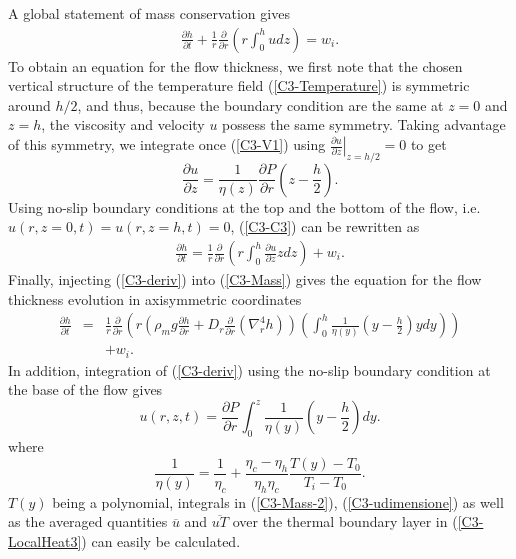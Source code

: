 A global statement of mass conservation gives
\begin{eqnarray}
  \frac{\partial h}{\partial t}+ \frac{1}{r}
  \frac{\partial}{\partial
  r} \left( r\int_0^hudz\right)= w_i.
  \label{C3-C3}
\end{eqnarray}
To obtain an  equation for the flow thickness, we  first note that the
chosen    vertical     structure    of    the     temperature    field
(\ref{C3-Temperature}) is  symmetric around  $h/2$, and  thus, because
the boundary condition are the same  at $z=0$ and $z=h$, the viscosity
and velocity $u$ possess the  same symmetry.  Taking advantage of this
symmetry,      we     integrate      once     (\ref{C3-V1})      using
$\left.\frac{\partial u}{\partial z}\right|_{z=h/2}=0$ to get
\begin{equation}
  \frac{\partial   u}{\partial   z}   =   \frac{1}{\eta(z)}\frac{\partial
    P}{\partial r}\left(z-\frac{h}{2}\right).
  \label{C3-deriv}
\end{equation}
Using no-slip  boundary conditions at  the top  and the bottom  of the
flow, i.e.  $u(r,z=0,t)=u(r,z=h,t)=0$,  (\ref{C3-C3}) can be rewritten
as
\begin{eqnarray}
  \frac{\partial h}{\partial t} = \frac{1}{r}
  \frac{\partial}{\partial
  r} \left( r\int_0^h\frac{\partial u}{\partial z}zdz\right) + w_i.
  \label{C3-Mass}
\end{eqnarray}
Finally,  injecting (\ref{C3-deriv})  into  (\ref{C3-Mass}) gives  the
equation for the flow thickness evolution in axisymmetric coordinates
\begin{eqnarray}
  \frac{\partial h}{\partial t} &=& \frac{1}{r}
  \frac{\partial}{\partial r} \left( r\left(\rho_m g \frac{\partial h}{\partial      r}+D_r\frac{\partial}{\partial      r}\left(\nabla_r^4h\right)\right)\left(\int_0^h\frac{1}{\eta(y)}\left(y-\frac{h}{2}\right)ydy\right)\right)\nonumber\\
  &&+ w_i.
  \label{C3-Mass-2}
\end{eqnarray}
In  addition,  integration  of   (\ref{C3-deriv})  using  the  no-slip
boundary condition at the base of the flow gives
\begin{equation}
  u(r,z,t)        =        \frac{\partial        P}{\partial        r}
  \int_0^z\frac{1}{\eta(y)}\left(y-\frac{h}{2}\right)dy.
  \label{C3-udimensione}
\end{equation}
where
\begin{equation}
  \frac{1}{\eta(y)} = \frac{1}{\eta_c}+\frac{\eta_c-\eta_h}{\eta_h\eta_c}\frac{T(y)-T_0}{T_i-T_0}.
\end{equation}
$T(y)$    being   a    polynomial,   integrals    in   (\ref{C3-Mass-2}),
(\ref{C3-udimensione})   as   well    as   the   averaged   quantities
$\overline{u}$ and $\overline{uT}$ over  the thermal boundary layer in
(\ref{C3-LocalHeat3}) can easily be calculated.

